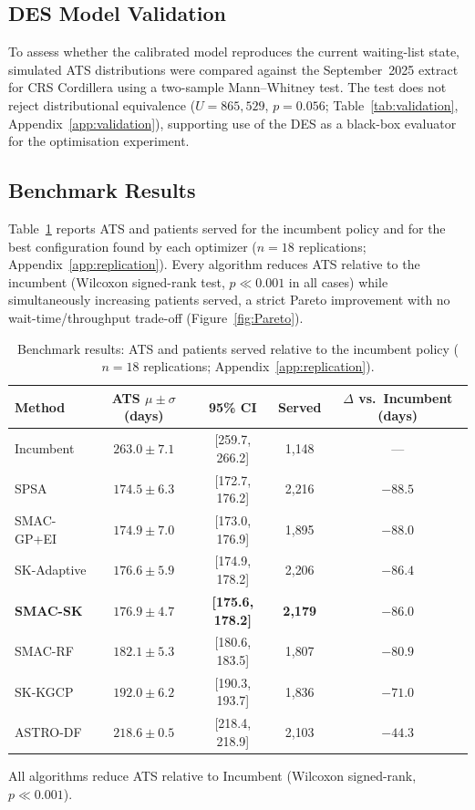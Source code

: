 \documentclass[11pt]{elsarticle}
\begin{document}
\subsection{DES Model Validation}

To assess whether the calibrated model reproduces the current waiting-list state, simulated ATS distributions were compared against the September~2025 extract for CRS Cordillera using a two-sample Mann--Whitney test. The test does not reject distributional equivalence ($U = 865{,}529$, $p = 0.056$; Table~\ref{tab:validation}, Appendix~\ref{app:validation}), supporting use of the DES as a black-box evaluator for the optimisation experiment.

\subsection{Benchmark Results}

Table~\ref{tab:results} reports ATS and patients served for the incumbent policy and for the best configuration found by each optimizer ($n = 18$ replications; Appendix~\ref{app:replication}). Every algorithm reduces ATS relative to the incumbent (Wilcoxon signed-rank test, $p \ll 0.001$ in all cases) while simultaneously increasing patients served, a strict Pareto improvement with no wait-time/throughput trade-off (Figure~\ref{fig:Pareto}).

\begin{table}[H]
\centering
\caption{Benchmark results: ATS and patients served relative to the incumbent policy
         ($n = 18$ replications; Appendix~\ref{app:replication}).}
\label{tab:results}
\begin{threeparttable}
\begin{tabular}{@{}lcccc@{}}
\toprule
Method & ATS $\mu\pm\sigma$ (days) & 95\% CI & Served
       & $\Delta$ vs.\ Incumbent (days) \\
\midrule
Incumbent    & $263.0\pm7.1$ & [259.7, 266.2] & 1{,}148 & --- \\
\midrule
SPSA         & $174.5\pm6.3$ & [172.7, 176.2] & 2{,}216 & $-88.5$ \\
SMAC-GP+EI   & $174.9\pm7.0$ & [173.0, 176.9] & 1{,}895 & $-88.0$ \\
SK-Adaptive  & $176.6\pm5.9$ & [174.9, 178.2] & 2{,}206 & $-86.4$ \\
\textbf{SMAC-SK} & $\mathbf{176.9\pm4.7}$ & \textbf{[175.6, 178.2]}
             & \textbf{2{,}179} & $\mathbf{-86.0}$ \\
SMAC-RF      & $182.1\pm5.3$ & [180.6, 183.5] & 1{,}807 & $-80.9$ \\
SK-KGCP      & $192.0\pm6.2$ & [190.3, 193.7] & 1{,}836 & $-71.0$ \\
ASTRO-DF     & $218.6\pm0.5$ & [218.4, 218.9] & 2{,}103 & $-44.3$ \\
\bottomrule
\end{tabular}
\begin{tablenotes}
\footnotesize
\item All algorithms reduce ATS relative to Incumbent
      (Wilcoxon signed-rank, $p\ll0.001$).
\end{tablenotes}
\end{threeparttable}
\end{table}
\end{document}
